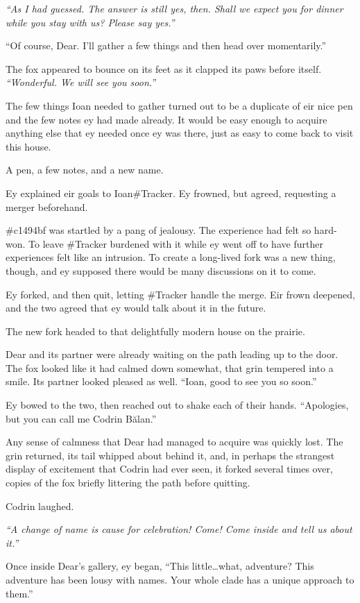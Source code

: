 \emph{``As I had guessed. The answer is still yes, then. Shall we expect you for dinner while you stay with us? Please say yes.''}

``Of course, Dear. I'll gather a few things and then head over momentarily.''

The fox appeared to bounce on its feet as it clapped its paws before itself. \emph{``Wonderful. We will see you soon.''}

The few things Ioan needed to gather turned out to be a duplicate of eir nice pen and the few notes ey had made already. It would be easy enough to acquire anything else that ey needed once ey was there, just as easy to come back to visit this house.

A pen, a few notes, and a new name.

Ey explained eir goals to Ioan\#Tracker. Ey frowned, but agreed, requesting a merger beforehand.

\#c1494bf was startled by a pang of jealousy. The experience had felt so hard-won. To leave \#Tracker burdened with it while ey went off to have further experiences felt like an intrusion. To create a long-lived fork was a new thing, though, and ey supposed there would be many discussions on it to come.

Ey forked, and then quit, letting \#Tracker handle the merge. Eir frown deepened, and the two agreed that ey would talk about it in the future.

The new fork headed to that delightfully modern house on the prairie.

Dear and its partner were already waiting on the path leading up to the door. The fox looked like it had calmed down somewhat, that grin tempered into a smile. Its partner looked pleased as well. ``Ioan, good to see you so soon.''

Ey bowed to the two, then reached out to shake each of their hands. ``Apologies, but you can call me Codrin Bălan.''

Any sense of calmness that Dear had managed to acquire was quickly lost. The grin returned, its tail whipped about behind it, and, in perhaps the strangest display of excitement that Codrin had ever seen, it forked several times over, copies of the fox briefly littering the path before quitting.

Codrin laughed.

\emph{``A change of name is cause for celebration! Come! Come inside and tell us about it.''}

Once inside Dear's gallery, ey began, ``This little\ldots{}what, adventure? This adventure has been lousy with names. Your whole clade has a unique approach to them.''

